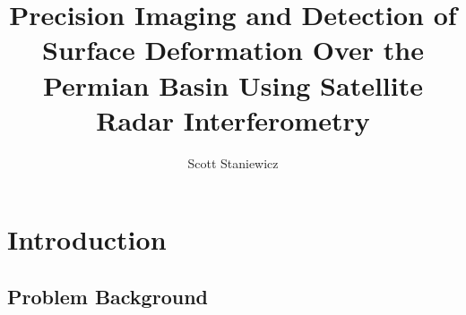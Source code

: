 \documentclass{utexasthesis}
\title{Precision Imaging and Detection of Surface Deformation Over the Permian Basin Using Satellite Radar Interferometry }
\author{Scott Staniewicz}
\begin{document}
\maketitle

\begin{dedication}


\end{dedication}


\begin{acknowledgments}

\end{acknowledgments}

\begin{abstract}
\end{abstract}

\maketableofcontents


\chapter{Introduction}


\section{Problem Background}
\label{sec:chap1-problem}



\end{document}
